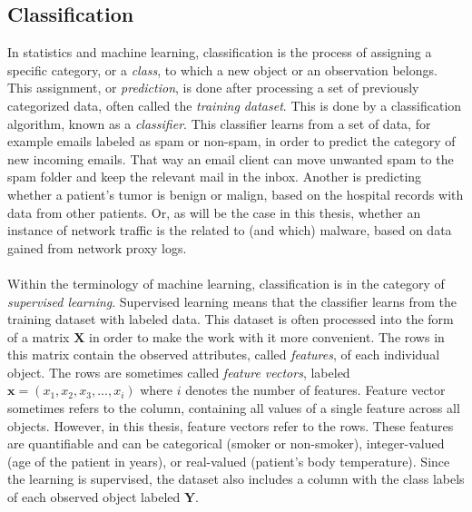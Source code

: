 \documentclass[11pt]{article}
\begin{document}
    \subsection{Classification}
      In statistics and machine learning, classification is the process of assigning a specific category, or a {\it class}, to which a new object or an observation belongs. \cite{elements} This assignment, or {\it prediction}, is done after processing a set of previously categorized data, often called the {\it training dataset}. \cite{elements} This is done by a classification algorithm, known as a {\it classifier}. \cite{elements} This classifier learns from a set of data, for example emails labeled as spam or non-spam, in order to predict the category of new incoming emails. That way an email client can move unwanted spam to the spam folder and keep the relevant mail in the inbox. Another is predicting whether a patient's tumor is benign or malign, based on the hospital records with data from other patients. Or, as will be the case in this thesis, whether an instance of network traffic is the related to (and which) malware, based on data gained from network proxy logs.
      \\~\\
      Within the terminology of machine learning, classification is in the category of {\it supervised learning}. \cite{mlintro} Supervised learning means that the classifier learns from the training dataset with labeled data. This dataset is often processed into the form of a matrix $\mathbf{X}$ in order to make the work with it more convenient. The rows in this matrix contain the observed attributes, called {\it features}, of each individual object. The rows are sometimes called {\it feature vectors}, labeled $\mathbf{x} = \left( x_1, x_2, x_3, ..., x_i \right)$ where $i$ denotes the number of features. Feature vector sometimes refers to the column, containing all values of a single feature across all objects. However, in this thesis, feature vectors refer to the rows. These features are quantifiable and can be categorical (smoker or non-smoker), integer-valued (age of the patient in years), or real-valued (patient's body temperature). Since the learning is supervised, the dataset also includes a column with the class labels of each observed object labeled $\mathbf{Y}$.
      \\~\\
\end{document}
